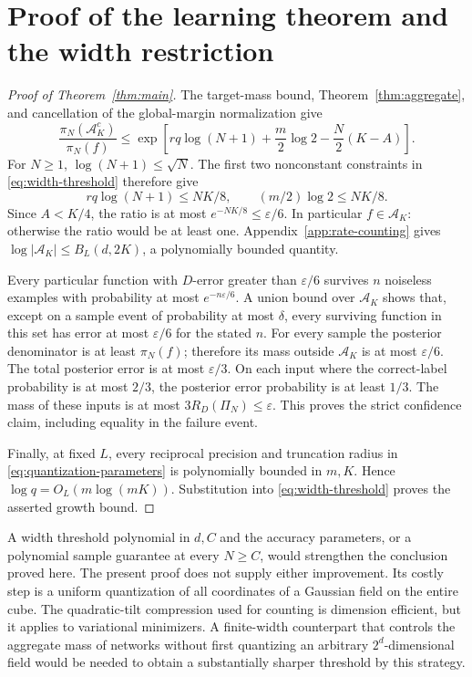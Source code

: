 \documentclass[11pt]{article}
\theoremstyle{remark}\newtheorem{remark}[theorem]{Remark}
\begin{document}
\section{Proof of the learning theorem and the width restriction}
\begin{proof}[Proof of Theorem~\ref{thm:main}]
The target-mass bound, Theorem~\ref{thm:aggregate}, and cancellation of
the global-margin normalization give
\[
 \frac{\pi_N(\mathcal A_K^c)}{\pi_N(f)}
 \leq\exp\left[rq\log(N+1)+\frac m2\log2
                   -\frac N2(K-A)\right].
\]
For $N\geq1$, $\log(N+1)\leq\sqrt N$. The first two nonconstant
constraints in \eqref{eq:width-threshold} therefore give
\[
 rq\log(N+1)\leq NK/8,\qquad (m/2)\log2\leq NK/8.
\]
Since $A<K/4$, the ratio is at most $e^{-NK/8}\leq\varepsilon/6$.
In particular $f\in\mathcal A_K$: otherwise the ratio would be at least
one. Appendix~\ref{app:rate-counting} gives
$\log|\mathcal A_K|\leq B_L(d,2K)$, a polynomially bounded quantity.

Every particular function with $D$-error greater than $\varepsilon/6$
survives $n$ noiseless examples with probability at most
$e^{-n\varepsilon/6}$. A union bound over $\mathcal A_K$ shows that,
except on a sample event of probability at most $\delta$, every surviving
function in this set has error at most $\varepsilon/6$ for the stated $n$.
For every sample the posterior denominator is at least $\pi_N(f)$;
therefore its mass outside $\mathcal A_K$ is at most $\varepsilon/6$.
The total posterior error is at most $\varepsilon/3$.
On each input where the correct-label probability is at most $2/3$, the
posterior error probability is at least $1/3$. The mass of these inputs is
at most $3R_D(\Pi_N)\leq\varepsilon$. This proves the strict confidence
claim, including equality in the failure event.

Finally, at fixed $L$, every reciprocal precision and truncation radius in
\eqref{eq:quantization-parameters} is polynomially bounded in $m,K$.
Hence $\log q=O_L(m\log(mK))$. Substitution into
\eqref{eq:width-threshold} proves the asserted growth bound.
\end{proof}

A width threshold polynomial in $d,C$ and the accuracy parameters, or a
polynomial sample guarantee at every $N\geq C$, would strengthen the
conclusion proved here. The present proof does not supply either improvement.
Its costly step is a uniform quantization of all coordinates of a Gaussian
field on the entire cube. The quadratic-tilt compression used for counting
is dimension efficient, but it applies to variational minimizers. A
finite-width counterpart that controls the aggregate mass of networks
without first quantizing an arbitrary $2^d$-dimensional field would be needed
to obtain a substantially sharper threshold by this strategy.
\end{document}
